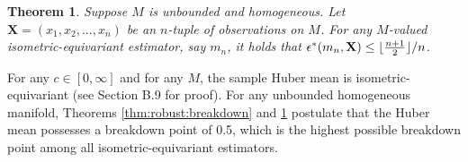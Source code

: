 \documentclass[preprint]{imsart}
\DeclarePairedDelimiter\floor{\lfloor}{\rfloor}
\newcommand{\bbH}{\mathbb{H}}
\newcommand{\bbR}{\mathbb{R}}
\newcommand{\bX}{\mathbf{X}}
\theoremstyle{plain}
\newtheorem{theorem}{Theorem}
\newtheorem{definition}{Definition}
\theoremstyle{remark}
\begin{document}








\begin{theorem}\label{thm:breakdown:0.5}
Suppose $M$ is unbounded and homogeneous. Let $\mathbf{X}=(x_{1}, x_{2}, ..., x_{n})$ be an $n$-tuple of observations on $M$. For any $M$-valued isometric-equivariant estimator, say $m_{n}$, it holds that $\epsilon^{*}(m_{n}, \mathbf{X}) \le \floor{\frac{n+1}{2}}/n$.
\end{theorem}

For any $c\in[0, \infty]$ and for any $M$, the sample Huber mean is isometric-equivariant (see Section B.9 for proof). For any unbounded homogeneous manifold, Theorems \ref{thm:robust:breakdown} and \ref{thm:breakdown:0.5} postulate that the Huber mean possesses a breakdown point of 0.5, which is the highest possible breakdown point among all isometric-equivariant estimators.
\end{document}
